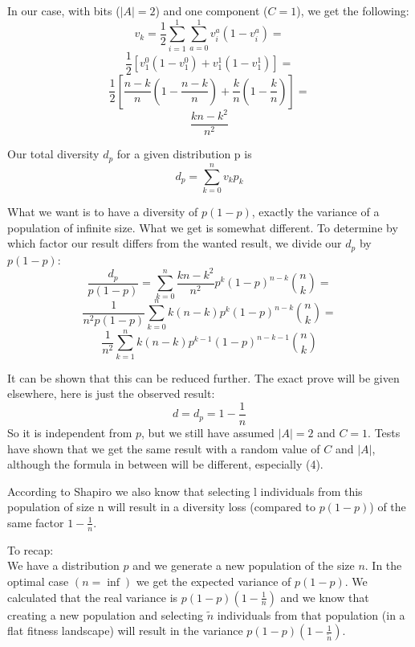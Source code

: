 \documentclass[a4paper,twoside]{report}
\begin{document}
In our case, with bits (\(|A| = 2\)) and one component (\(C = 1\)), we get the following:
\[
v_k = \frac{1}{2} \sum_{i=1}^{1} \sum_{a=0}^{1} v^{a}_i (1 - v^{a}_i) = 
\]
\[
      \frac{1}{2} [v^{0}_1(1-v^{0}_1) + v^{1}_1(1 - v^{1}_1)] =
\]
\[
      \frac{1}{2} [\frac{n-k}{n} (1 - \frac{n-k}{n}) + \frac{k}{n} (1 - \frac{k}{n})] = 
\]
\[
      \frac{kn - k^{2}}{n^{2}}
\]

Our total diversity \(d_p\) for a given distribution p is
\begin{equation}
d_p = \sum_{k=0}^{n} v_k p_k
\end{equation}

What we want is to have a diversity of \(p (1 - p)\), exactly the variance of a population of infinite size. What we get is somewhat different. To determine by which factor our result differs from the wanted result, we divide our \(d_p\) by \(p(1-p)\):
\[
\frac{d_p}{p(1-p)} = \sum_{k=0}^{n} \frac{kn - k^{2}}{n^{2}} p^{k} (1-p)^{n-k} {n \choose k} = 
\]
\[
\frac{1}{n^{2} p(1-p)} \sum_{k=0}^{n} k (n-k) p^{k} (1-p)^{n-k} {n \choose k} =
\]
\[
\frac{1}{n^{2}} \sum_{k=1}^{n} k (n-k) p^{k-1} (1-p)^{n-k-1} {n \choose k}
\]

It can be shown that this can be reduced further. The exact prove will be given elsewhere, here is just the observed result:
\begin{equation}
d = d_p = 1 - \frac{1}{n}
\end{equation}
So it is independent from \(p\), but we still have assumed \(|A| = 2\) and \(C = 1\). Tests have shown that we get the same result with a random value of \(C\) and \(|A|\), although the formula in between will be different, especially (4).

According to Shapiro \cite{Shapiro} we also know that selecting l individuals from this population of size n will result in a diversity loss (compared to \(p(1-p)\)) of the same factor \(1 - \frac{1}{n}\).

To recap:\\
We have a distribution \(p\) and we generate a new population of the size \(n\). In the optimal case \((n = \inf)\) we get the expected variance of \(p(1-p)\). We calculated that the real variance is \(p(1-p)(1 - \frac{1}{n})\) and we know that creating a new population and selecting \(\tilde{n}\) individuals from that population (in a flat fitness landscape) will result in the variance \(p(1-p)(1 - \frac{1}{\tilde{n}})\).
\end{document}
